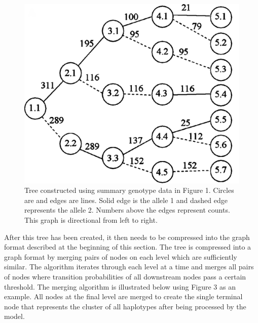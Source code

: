 \documentclass[a4paper,12pt,twoside,abstraction,titlepage]{article}
\begin{document}
\begin{figure}[htp!]
\vspace{-10pt}
\begin{center}
\centerline{\includegraphics[scale=0.08]{fig3}}
\caption{Tree constructed using summary genotype data in Figure 1. Circles are and edges are lines. Solid edge is the allele 1 and dashed edge represents the allele 2. Numbers above the edges represent counts.  This graph is directional from left to right. \cite{beagle1}}

\end{center}
\vspace{-25pt}
\end{figure}


After this tree has been created, it then needs to be compressed into the graph format described at the beginning of this section.  The tree is compressed into a graph format by merging pairs of nodes on each level which are sufficiently similar.  The algorithm iterates through each level at a time and merges all pairs of nodes where transition probabilities of all downstream nodes pass a certain threshold.  The merging algorithm is illustrated below using Figure 3 as an example.  All nodes at the final level are merged to create the single terminal node that represents the cluster of all haplotypes after being processed by the model.
\end{document}
